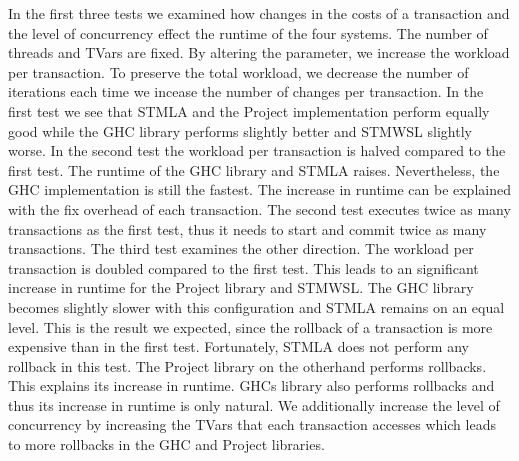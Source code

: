 In the first three tests we examined how changes in the costs of a transaction and the level of concurrency effect the runtime of the four systems. 
The number of threads and TVars are fixed. By altering the  parameter, we increase the workload per 
transaction. To preserve the total workload, we decrease the number of iterations each time we incease the number
of changes per transaction. In the first test we see that STMLA and the Project implementation perform equally good while the GHC 
library performs slightly better and STMWSL slightly worse. In the second test the workload per transaction is halved compared to the
first test. The runtime of the GHC library and STMLA raises. Nevertheless, the GHC implementation is still the fastest. The increase 
in runtime can be explained with the fix overhead of each transaction. The second test executes twice as many transactions as
the first test, thus it needs to start and commit twice as many transactions.
The third test examines the other direction. The workload per transaction is doubled compared to the first test. 
This leads to an significant increase in runtime for the Project library and STMWSL. The GHC library becomes 
slightly slower with this configuration and STMLA remains on an equal level. This is the result we expected, since the rollback of 
a transaction is more expensive than in the first test. Fortunately, STMLA does not perform any rollback in this test. The Project
library on the otherhand performs rollbacks. This explains its increase in runtime. GHCs library also performs rollbacks
and thus its increase in runtime is only natural. We additionally increase the level of concurrency by increasing the 
TVars that each transaction accesses which leads to more rollbacks in the GHC and Project libraries.  

